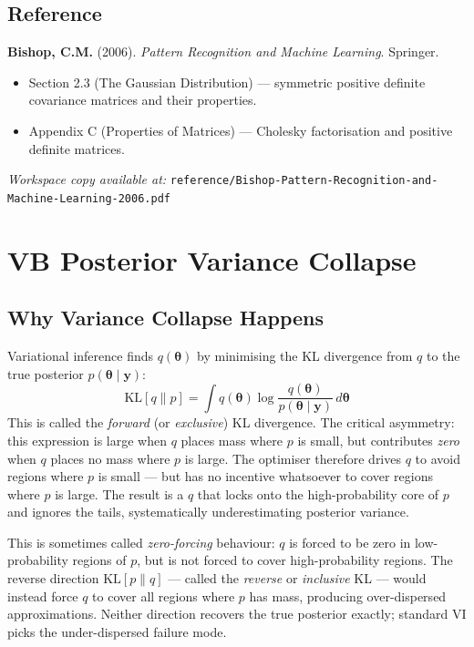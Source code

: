 \documentclass[11pt]{article}
\begin{document}
\subsection*{Reference}

\noindent\textbf{Bishop, C.M.} (2006). \textit{Pattern Recognition and Machine Learning}. Springer.
\begin{itemize}
  \item Section 2.3 (The Gaussian Distribution) --- symmetric positive definite covariance matrices and their properties.
  \item Appendix C (Properties of Matrices) --- Cholesky factorisation and positive definite matrices.
\end{itemize}
\noindent\textit{Workspace copy available at:} \texttt{reference/Bishop-Pattern-Recognition-and-Machine-Learning-2006.pdf}

\bigskip

\section{VB Posterior Variance Collapse}

\subsection*{Why Variance Collapse Happens}

Variational inference finds $q(\bm{\theta})$ by minimising the KL divergence from $q$ to the true posterior $p(\bm{\theta}\mid\bm{y})$:
\begin{equation}
  \mathrm{KL}[q \| p] = \int q(\bm{\theta}) \log \frac{q(\bm{\theta})}{p(\bm{\theta}\mid\bm{y})} \, d\bm{\theta}
\end{equation}
This is called the \emph{forward} (or \emph{exclusive}) KL divergence. The critical asymmetry: this expression is large when $q$ places mass where $p$ is small, but contributes \emph{zero} when $q$ places no mass where $p$ is large. The optimiser therefore drives $q$ to avoid regions where $p$ is small --- but has no incentive whatsoever to cover regions where $p$ is large. The result is a $q$ that locks onto the high-probability core of $p$ and ignores the tails, systematically underestimating posterior variance.

This is sometimes called \emph{zero-forcing} behaviour: $q$ is forced to be zero in low-probability regions of $p$, but is not forced to cover high-probability regions. The reverse direction $\mathrm{KL}[p \| q]$ --- called the \emph{reverse} or \emph{inclusive} KL --- would instead force $q$ to cover all regions where $p$ has mass, producing over-dispersed approximations. Neither direction recovers the true posterior exactly; standard VI picks the under-dispersed failure mode.
\end{document}
